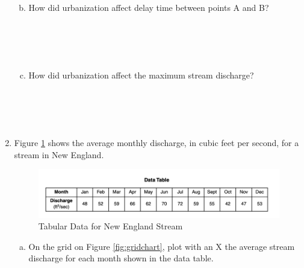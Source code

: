 \documentclass[12pt]{article}
\begin{document}
\begin{enumerate}
\begin{enumerate}[a)]
~\\
~\\
\item How did urbanization affect delay time between points A and B?\\
~\\
~\\
~\\
~\\
\item How did urbanization affect the maximum stream discharge?\\
~\\
~\\
~\\
~\\
\end{enumerate}
\clearpage
\item Figure \ref{fig:datatable} shows the average monthly discharge, in cubic feet per second, for a stream in New England.\newline

\begin{figure}[h!] %
   \centering
   \includegraphics[width=5in]{datatable.png} 
   \caption{Tabular Data for New England Stream}
   \label{fig:datatable}
\end{figure}

\begin{enumerate}[a)]
\item On the grid on Figure \ref{fig:gridchart}, plot with an X the average stream discharge for
each month shown in the data table. \newline


\end{enumerate}
\end{enumerate}
\end{document}
